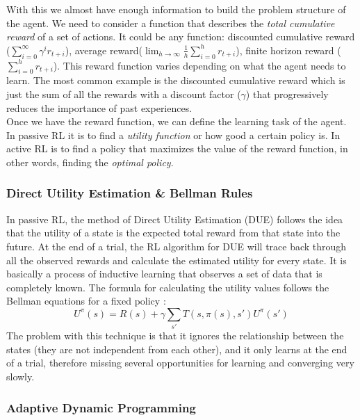 With this we almost have enough information to build the problem structure of the agent. We need to consider a function that describes the  \emph{total cumulative reward} of a set of actions. It could be any function: discounted cumulative reward ($\sum^{\infty}_{i=0}\gamma^ir_{t+i}$), average reward($\lim_{h\to\infty}\frac{1}{h}\sum^{h}_{i=0}r_{t+i}$), finite horizon reward ($\sum^{h}_{i=0}r_{t+i}$). This reward function varies depending on what the agent needs to learn. The most common example is the discounted cumulative reward which is just the sum of all the rewards with a discount factor ($\gamma$) that progressively reduces the importance of past experiences. \\


Once we have the reward function, we can define the learning task of the agent. In passive RL it is to find a \emph{utility function} or how good a certain policy is. In active RL is to find a policy that maximizes the value of the reward function, in other words, finding the \emph{optimal policy}.\cite{ml_tom_mitchel}\\



\subsubsection{Direct Utility Estimation \& Bellman Rules}

In passive RL, the method of Direct Utility Estimation (DUE) follows the idea that the utility of a state is the expected total reward from that state into the future. At the end of a trial, the RL algorithm for DUE will trace back through all the observed rewards and calculate the estimated utility for every state. It is basically a process of inductive learning that observes a set of data that is completely known. The formula for calculating the utility values follows the Bellman equations for a fixed policy \cite{rl}:\\


\begin{equation}
U^\pi(s) = R(s)+\gamma\sum_{s'}T(s,\pi(s),s') U^\pi(s')
\end{equation}
The problem with this technique is that it ignores the relationship between the states (they are not independent from each other), and it only learns at the end of a trial, therefore missing several opportunities for learning and converging very slowly\cite{rl}.

\subsubsection{Adaptive Dynamic Programming}


